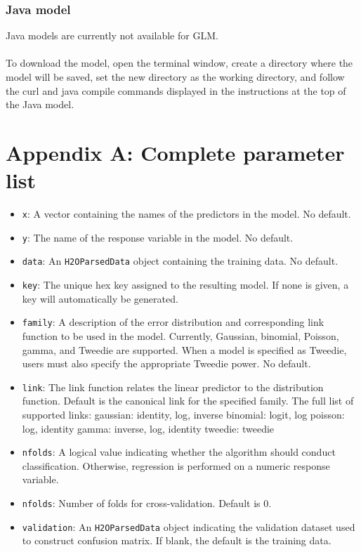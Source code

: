 \documentclass[11pt]{article}
\begin{document}
\subsubsection{Java model} 
Java models are currently not available for GLM.
\\
\\
To download the model, open the terminal window, create a directory where the model will be saved, set the new directory as the working directory, and follow the curl and java compile commands displayed in the instructions at the top of the Java model.

\newpage
\section{Appendix A: Complete parameter list}
\begin{itemize}
\item \texttt{x}: A vector containing the names of the predictors in the model. No default.
\item \texttt{y}: The name of the response variable in the model. No default.
\item \texttt{data}: An \texttt{H2OParsedData} object containing the training data. No default.
\item \texttt{key}: The unique hex key assigned to the resulting model. If none is given, a key will automatically be generated.
\item \texttt{family}: A description of the error distribution and corresponding link function to be used in the model. Currently, Gaussian, binomial, Poisson, gamma, and Tweedie are supported. When a model is specified as Tweedie, users must also specify the appropriate Tweedie power. No default.
\item \texttt{link}: The link function relates the linear predictor to the distribution function. Default is the canonical link for the specified family. The full list of supported links: 
	gaussian: identity, log, inverse 
	binomial: logit, log 
	poisson: log, identity
	gamma: inverse, log, identity
	tweedie: tweedie 
\item \texttt{nfolds}: A logical value indicating whether the algorithm should conduct classification. Otherwise, regression is performed on a numeric response variable.
\item \texttt{nfolds}: Number of folds for cross-validation. Default is 0.
\item \texttt{validation}: An \texttt{H2OParsedData} object indicating the validation dataset used to construct confusion matrix. If  blank, the default is the training data.

\end{itemize}
\end{document}
